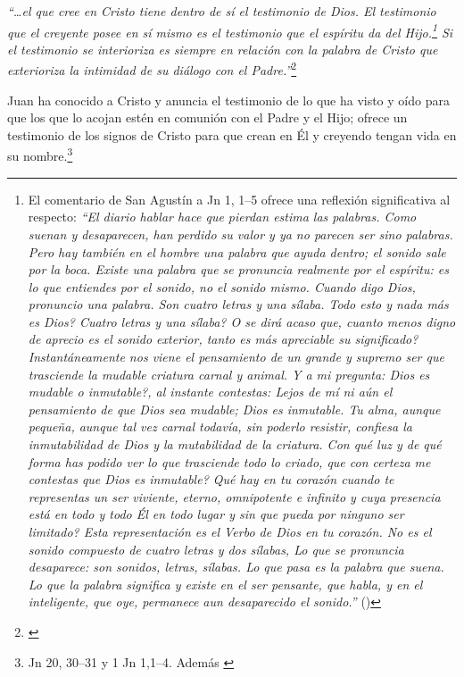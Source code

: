 \documentclass[../main.tex]{subfiles}
\begin{document}
 \emph{``\ldots{}el que cree en Cristo tiene dentro de sí el testimonio de Dios. El testimonio que el creyente posee en sí mismo es el testimonio que el espíritu da del Hijo.\footnote{El comentario de San Agustín a Jn 1, 1--5 ofrece una reflexión significativa al respecto:
\emph{``El diario hablar hace que pierdan estima las palabras. Como suenan y desaparecen, han perdido su valor y ya no parecen ser sino palabras. Pero hay también en el hombre una palabra que ayuda dentro; el sonido sale por la boca. Existe una palabra que se pronuncia realmente por el espíritu: es lo que entiendes por el sonido, no el sonido mismo. Cuando digo Dios, pronuncio una palabra. Son cuatro letras y una sílaba. \textquestiondown{}Todo esto y nada más es Dios? \textquestiondown{}Cuatro letras y una sílaba? \textquestiondown{}O se dirá acaso que, cuanto menos digno de aprecio es el sonido exterior, tanto es más apreciable su significado? Instantáneamente nos viene el pensamiento de un grande y supremo ser que trasciende la mudable criatura carnal y animal. Y a mi pregunta: \textquestiondown{}Dios es mudable o inmutable?, al instante contestas: Lejos de mí ni aún el pensamiento de que Dios sea mudable; Dios es inmutable. Tu alma, aunque pequeña, aunque tal vez carnal todavía, sin poderlo resistir, confiesa la inmutabilidad de Dios y la mutabilidad de la criatura. \textquestiondown{}Con qué luz y de qué forma has podido ver lo que trasciende todo lo criado, que con certeza me contestas que Dios es inmutable? \textquestiondown{}Qué hay en tu corazón cuando te representas un ser viviente, eterno, omnipotente e infinito y cuya presencia está en todo y todo Él en todo lugar y sin que pueda por ninguno ser limitado? Esta representación es el Verbo de Dios en tu corazón. No es el sonido compuesto de cuatro letras y dos sílabas, Lo que se pronuncia desaparece: son sonidos, letras, sílabas. Lo que pasa es la palabra que suena. Lo que la palabra significa y existe en el ser pensante, que habla, y en el inteligente, que oye, permanece aun desaparecido el sonido.''} (\cite[Tratado I, n.~1, 8]{aguscomentjn}) } Si el testimonio se interioriza es siempre en relación con la palabra de Cristo que exterioriza la intimidad de su diálogo con el Padre.''}\footnote{\cite[1530]{dicctf}}

Juan ha conocido a Cristo y anuncia el testimonio de lo que ha visto y oído para que los que lo acojan estén en comunión con el Padre y el Hijo; ofrece un testimonio de los signos de Cristo para que crean en Él y creyendo tengan vida en su nombre.\footnote{Jn 20, 30--31 y 1 Jn 1,1--4. Además \cite[1530]{dicctf}} 
\end{document}
